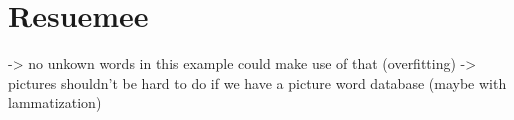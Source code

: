 \section{Resuemee}

-> no unkown words in this example could make use of that (overfitting)
-> pictures shouldn't be hard to do if we have a picture word database (maybe with lammatization)